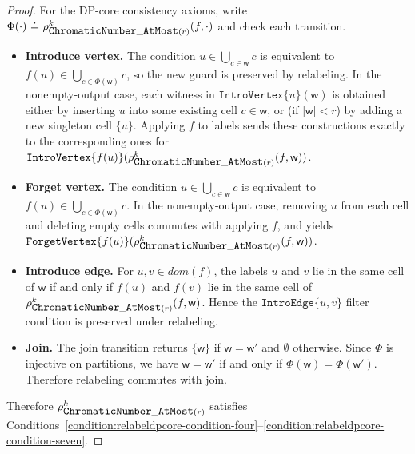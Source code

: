 \documentclass[11pt,a4paper]{article}
\newcommand{\treewidthvalue}{k}
\newcommand{\introvertextype}[1]{\mathtt{IntroVertex}\{#1\}}
\newcommand{\forgetvertextype}[1]{\mathtt{ForgetVertex}\{#1\}}
\newcommand{\introedgegeneric}[2]{\mathtt{IntroEdge}\{#1,#2\}}
\newcommand{\defeq}{~\dot{=}~}
\newcommand{\vertexone}{u}
\newcommand{\vertextwo}{v}
\newcommand{\awitness}{\mathsf{w}}
\newcommand{\dpNamePart}[1]{\mbox{\normalfont\ttfamily #1}}
\newcommand{\domain}{dom}
\newcommand{\numbercolors}{r}
\newcommand{\chromaticnumberAtMostCore}[1]{\dpNamePart{ChromaticNumber}\_\allowbreak\dpNamePart{AtMost}(#1)}
\newcommand{\relabelingfunction}{f}
\newcommand{\action}{\rho}
\begin{document}
\begin{proof}
	For the DP-core consistency axioms, write $\Phi(\cdot)\defeq \action_{\chromaticnumberAtMostCore{\numbercolors}}^\treewidthvalue(\relabelingfunction,\cdot)$ and check each transition.
	\begin{itemize}
\item \textbf{Introduce vertex.} The condition $\vertexone\in\bigcup_{c\in\awitness}c$ is equivalent to $\relabelingfunction(\vertexone)\in\bigcup_{c\in\Phi(\awitness)}c$, so the new guard is preserved by relabeling. In the nonempty-output case, each witness in $\introvertextype{\vertexone}(\awitness)$ is obtained either by inserting $\vertexone$ into some existing cell $c\in\awitness$, or (if $|\awitness|<\numbercolors$) by adding a new singleton cell $\{\vertexone\}$. Applying $\relabelingfunction$ to labels sends these constructions exactly to the corresponding ones for $\introvertextype{\relabelingfunction(\vertexone)}(\action_{\chromaticnumberAtMostCore{\numbercolors}}^\treewidthvalue(\relabelingfunction,\awitness))$.
\item \textbf{Forget vertex.} The condition $\vertexone\in\bigcup_{c\in\awitness}c$ is equivalent to $\relabelingfunction(\vertexone)\in\bigcup_{c\in\Phi(\awitness)}c$. In the nonempty-output case, removing $\vertexone$ from each cell and deleting empty cells commutes with applying $\relabelingfunction$, and yields $\forgetvertextype{\relabelingfunction(\vertexone)}(\action_{\chromaticnumberAtMostCore{\numbercolors}}^\treewidthvalue(\relabelingfunction,\awitness))$.
\item \textbf{Introduce edge.} For $\vertexone,\vertextwo\in \domain(\relabelingfunction)$, the labels $\vertexone$ and $\vertextwo$ lie in the same cell of $\awitness$ if and only if $\relabelingfunction(\vertexone)$ and $\relabelingfunction(\vertextwo)$ lie in the same cell of $\action_{\chromaticnumberAtMostCore{\numbercolors}}^\treewidthvalue(\relabelingfunction,\awitness)$. Hence the $\introedgegeneric{\vertexone}{\vertextwo}$ filter condition is preserved under relabeling.
	\item \textbf{Join.} The join transition returns $\{\awitness\}$ if $\awitness=\awitness'$ and $\emptyset$ otherwise. Since $\Phi$ is injective on partitions, we have $\awitness=\awitness'$ if and only if $\Phi(\awitness)=\Phi(\awitness')$. Therefore relabeling commutes with join.
	\end{itemize}
Therefore $\action_{\chromaticnumberAtMostCore{\numbercolors}}^\treewidthvalue$ satisfies Conditions~\ref{condition:relabeldpcore-condition-four}--\ref{condition:relabeldpcore-condition-seven}.
\end{proof}
\end{document}
